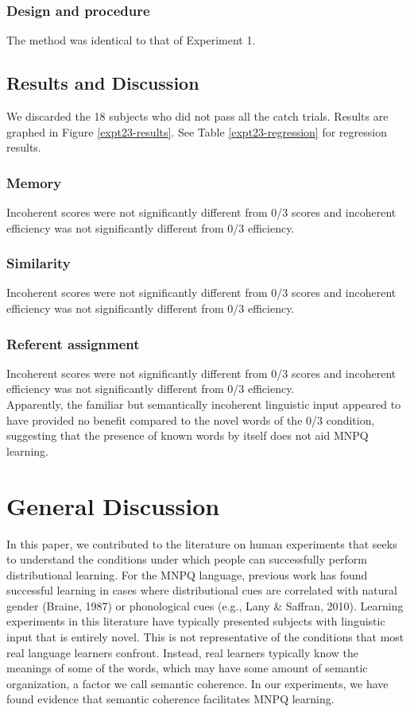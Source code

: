 \documentclass[man,floatsintext]{apa6}
\begin{document}
\subsubsection{Design and procedure} The method was identical to that
of Experiment 1.

\subsection{Results and Discussion} We discarded the 18 subjects who
did not pass all the catch trials. Results are graphed in Figure
\ref{expt23-results}. See Table \ref{expt23-regression} for regression
results.

\subsubsection{Memory} Incoherent scores were not significantly
different from 0/3 scores and incoherent efficiency was not
significantly different from 0/3 efficiency.

\subsubsection{Similarity} Incoherent scores were not significantly
different from 0/3 scores and incoherent efficiency was not
significantly different from 0/3 efficiency.

\subsubsection{Referent assignment} Incoherent scores were not
significantly different from 0/3 scores and incoherent efficiency was
not significantly different from 0/3 efficiency.\\

Apparently, the familiar but semantically incoherent linguistic input
appeared to have provided no benefit compared to the novel words of
the 0/3 condition, suggesting that the presence of known words by
itself does not aid MNPQ learning.

\section{General Discussion}

In this paper, we contributed to the literature on human experiments
that seeks to understand the conditions under which people can
successfully perform distributional learning. For the MNPQ language,
previous work has found successful learning in cases where
distributional cues are correlated with natural gender (Braine, 1987)
or phonological cues (e.g., Lany \& Saffran, 2010). Learning
experiments in this literature have typically presented subjects with
linguistic input that is entirely novel. This is not representative of
the conditions that most real language learners confront. Instead,
real learners typically know the meanings of some of the words, which
may have some amount of semantic organization, a factor we call
semantic coherence. In our experiments, we have found evidence that
semantic coherence facilitates MNPQ learning.
\end{document}
